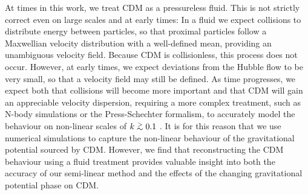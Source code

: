 \documentclass{aastex}
\def\gtsima{$\; \buildrel > \over \sim \;$}
\def\gsim{\lower.5ex\hbox{\gtsima}}
\begin{document}
At times in this work, we treat CDM as a pressureless fluid.  This is not
strictly correct even on large scales and at early times: In a fluid we expect collisions 
to distribute energy between particles,
so that proximal particles follow a Maxwellian velocity distribution
with a well-defined mean, providing an unambiguous velocity field.  
Because CDM is collisionless, 
this process does not occur.  However, at
early times, we expect deviations from the Hubble flow to be very
small, so that a velocity field may still be defined.  As time
progresses, we expect both that collisions will become more important
and that CDM will gain an appreciable
velocity dispersion, requiring a more complex treatment, such as
N-body simulations or the Press-Schechter formalism, to accurately model
the behaviour on non-linear scales of $k \gsim 0.1$
\citep{press74,msII,schneider}.  
It is for this reason that we 
use numerical simulations to capture the non-linear behaviour of the
gravitational potential sourced by CDM.  However, we find
that reconstructing the CDM behaviour using a fluid treatment
provides valuable insight into both the accuracy of our
semi-linear method and the effects of the changing gravitational
potential phase on CDM.



\end{document}
